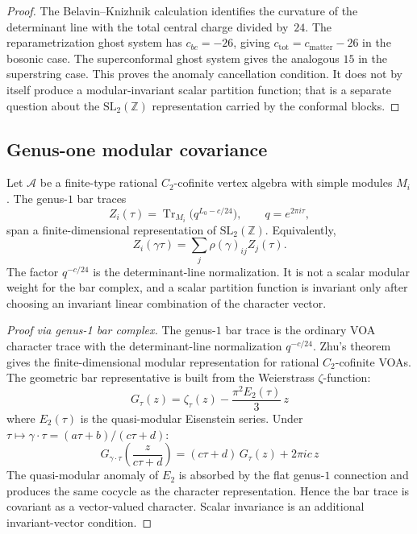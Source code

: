 \begin{proof}
The Belavin--Knizhnik calculation identifies the curvature of the
determinant line with the total central charge divided by~$24$. The
reparametrization ghost system has $c_{bc}=-26$, giving
$c_{\mathrm{tot}}=c_{\mathrm{matter}}-26$ in the bosonic case. The
superconformal ghost system gives the analogous $15$ in the
superstring case. This proves the anomaly cancellation condition. It
does not by itself produce a modular-invariant scalar partition
function; that is a separate question about the
$\mathrm{SL}_2(\mathbb Z)$ representation carried by the conformal
blocks.
\end{proof}


\subsection{\texorpdfstring{Genus-one modular covariance}{Genus-one modular covariance}}

\begin{theorem}\label{thm:modular-invariance}
Let $\mathcal A$ be a finite-type rational $C_2$-cofinite vertex
algebra with simple modules $M_i$. The genus-$1$ bar traces
\[
Z_i(\tau)=\operatorname{Tr}_{M_i}\bigl(q^{L_0-c/24}\bigr),
\qquad q=e^{2\pi i\tau},
\]
span a finite-dimensional representation of
$\mathrm{SL}_2(\mathbb Z)$. Equivalently,
\[
Z_i(\gamma\tau)=\sum_j \rho(\gamma)_{ij}Z_j(\tau).
\]
The factor $q^{-c/24}$ is the determinant-line normalization. It is
not a scalar modular weight for the bar complex, and a scalar
partition function is invariant only after choosing an invariant
linear combination of the character vector.
\end{theorem}

\begin{proof}[Proof via genus-1 bar complex]
The genus-$1$ bar trace is the ordinary VOA character trace with the
determinant-line normalization $q^{-c/24}$. Zhu's theorem gives the
finite-dimensional modular representation for rational $C_2$-cofinite
VOAs. The geometric bar representative is built from the Weierstrass
$\zeta$-function:
\[
G_\tau(z) = \zeta_\tau(z) - \frac{\pi^2 E_2(\tau)}{3}\,z
\]
where $E_2(\tau)$ is the quasi-modular Eisenstein series. Under $\tau \mapsto \gamma\cdot\tau = (a\tau+b)/(c\tau+d)$:
\[
G_{\gamma\cdot\tau}\!\left(\frac{z}{c\tau+d}\right) = (c\tau+d)\,G_\tau(z) + 2\pi i c\,z
\]
The quasi-modular anomaly of $E_2$ is absorbed by the flat
genus-$1$ connection and produces the same cocycle as the character
representation. Hence the bar trace is covariant as a vector-valued
character. Scalar invariance is an additional invariant-vector
condition.
\end{proof}

